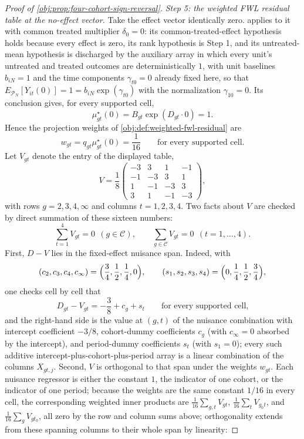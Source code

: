 \begin{proof}[Proof of \cref{obj:prop:four-cohort-sign-reversal}]
\textit{Step 5: the weighted FWL residual table at the no-effect vector.} Take the effect vector identically zero.  applies to it with common treated multiplier \(\delta_0=0\): its common-treated-effect hypothesis holds because every effect is zero, its rank hypothesis is Step 1, and its untreated-mean hypothesis is discharged by the auxiliary array in which every unit's untreated and treated outcomes are deterministically \(1\), with unit baselines \(b_{iN}=1\) and the time components \(\gamma_{t0}=0\) already fixed here, so that \(E_{\mathcal P_N}[Y_{it}(0)]=1=b_{iN}\exp(\gamma_{t0})\) with the normalization \(\gamma_{10}=0\). Its conclusion gives, for every supported cell,
\[
\mu^\star_{gt}(0)=B_{gt}\exp(D_{gt}\cdot0)=1 .
\]
Hence the projection weights of \cref{obj:def:weighted-fwl-residual} are
\[
w_{gt}=q_{gt}\mu^\star_{gt}(0)=\frac{1}{16}
\qquad\text{for every supported cell.}
\]
Let \(V_{gt}\) denote the entry of the displayed table,
\[
V
=
\frac{1}{8}
\begin{pmatrix}
-3 & 3 & 1 & -1\\
-1 & -3 & 3 & 1\\
1 & -1 & -3 & 3\\
3 & 1 & -1 & -3
\end{pmatrix},
\]
with rows \(g=2,3,4,\infty\) and columns \(t=1,2,3,4\). Two facts about \(V\) are checked by direct summation of these sixteen numbers:
\[
\sum_{t=1}^4V_{gt}=0\ \ (g\in\mathcal C),
\qquad
\sum_{g\in\mathcal C}V_{gt}=0\ \ (t=1,\ldots,4).
\]
First, \(D-V\) lies in the fixed-effect nuisance span. Indeed, with
\[
(c_2,c_3,c_4,c_\infty)=\Bigl(\frac34,\frac12,\frac14,0\Bigr),
\qquad
(s_1,s_2,s_3,s_4)=\Bigl(0,\frac14,\frac12,\frac34\Bigr),
\]
one checks cell by cell that
\[
D_{gt}-V_{gt}=-\frac38+c_g+s_t
\qquad\text{for every supported cell,}
\]
and the right-hand side is the value at \((g,t)\) of the nuisance combination with intercept coefficient \(-3/8\), cohort-dummy coefficients \(c_g\) (with \(c_\infty=0\) absorbed by the intercept), and period-dummy coefficients \(s_t\) (with \(s_1=0\)); every such additive intercept-plus-cohort-plus-period array is a linear combination of the columns \(X_{gt,j}\).
Second, \(V\) is orthogonal to that span under the weights \(w_{gt}\). Each nuisance regressor is either the constant \(1\), the indicator of one cohort, or the indicator of one period; because the weights are the same constant \(1/16\) in every cell, the corresponding weighted inner products are \(\frac1{16}\sum_{g,t}V_{gt}\), \(\frac1{16}\sum_tV_{g_0t}\), and \(\frac1{16}\sum_gV_{gt_0}\), all zero by the row and column sums above; orthogonality extends from these spanning columns to their whole span by linearity:

\end{proof}
